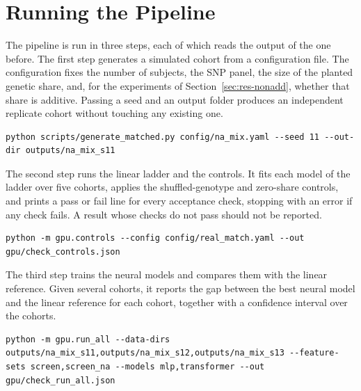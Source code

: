 \section{Running the Pipeline}
\label{sec:manual-run}
The pipeline is run in three steps, each of which reads the output of the one before. The first step generates a simulated cohort from a configuration file. The configuration fixes the number of subjects, the SNP panel, the size of the planted genetic share, and, for the experiments of Section~\ref{sec:res-nonadd}, whether that share is additive. Passing a seed and an output folder produces an independent replicate cohort without touching any existing one.
\par\noindent\begin{minipage}{\linewidth}
\begin{lstlisting}[style=shell]
python scripts/generate_matched.py config/na_mix.yaml --seed 11 --out-dir outputs/na_mix_s11
\end{lstlisting}
\end{minipage}\par
The second step runs the linear ladder and the controls. It fits each model of the ladder over five cohorts, applies the shuffled-genotype and zero-share controls, and prints a pass or fail line for every acceptance check, stopping with an error if any check fails. A result whose checks do not pass should not be reported.
\par\noindent\begin{minipage}{\linewidth}
\begin{lstlisting}[style=shell]
python -m gpu.controls --config config/real_match.yaml --out gpu/check_controls.json
\end{lstlisting}
\end{minipage}\par
The third step trains the neural models and compares them with the linear reference. Given several cohorts, it reports the gap between the best neural model and the linear reference for each cohort, together with a confidence interval over the cohorts.
\par\noindent\begin{minipage}{\linewidth}
\begin{lstlisting}[style=shell]
python -m gpu.run_all --data-dirs outputs/na_mix_s11,outputs/na_mix_s12,outputs/na_mix_s13 --feature-sets screen,screen_na --models mlp,transformer --out gpu/check_run_all.json
\end{lstlisting}
\end{minipage}\par

